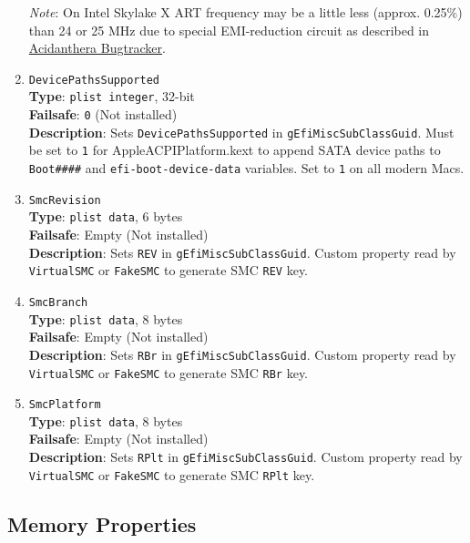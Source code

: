\documentclass[]{article}
\begin{document}
\begin{enumerate}
  \emph{Note}: On Intel Skylake X ART frequency may be a little less (approx. 0.25\%) than
  24 or 25 MHz due to special EMI-reduction circuit as described in
  \href{https://github.com/acidanthera/bugtracker/issues/448#issuecomment-524914166}{Acidanthera Bugtracker}.
\item
  \texttt{DevicePathsSupported}\\
  \textbf{Type}: \texttt{plist\ integer}, 32-bit\\
  \textbf{Failsafe}: \texttt{0} (Not installed)\\
  \textbf{Description}: Sets \texttt{DevicePathsSupported} in
  \texttt{gEfiMiscSubClassGuid}. Must be set to \texttt{1} for
  AppleACPIPlatform.kext to append SATA device paths to
  \texttt{Boot\#\#\#\#} and \texttt{efi-boot-device-data} variables.
  Set to \texttt{1} on all modern Macs.
\item
  \texttt{SmcRevision}\\
  \textbf{Type}: \texttt{plist\ data}, 6 bytes\\
  \textbf{Failsafe}: Empty (Not installed)\\
  \textbf{Description}: Sets \texttt{REV} in
  \texttt{gEfiMiscSubClassGuid}. Custom property read by
  \texttt{VirtualSMC} or \texttt{FakeSMC} to generate SMC \texttt{REV}
  key.
\item
  \texttt{SmcBranch}\\
  \textbf{Type}: \texttt{plist\ data}, 8 bytes\\
  \textbf{Failsafe}: Empty (Not installed)\\
  \textbf{Description}: Sets \texttt{RBr} in
  \texttt{gEfiMiscSubClassGuid}. Custom property read by
  \texttt{VirtualSMC} or \texttt{FakeSMC} to generate SMC \texttt{RBr}
  key.
\item
  \texttt{SmcPlatform}\\
  \textbf{Type}: \texttt{plist\ data}, 8 bytes\\
  \textbf{Failsafe}: Empty (Not installed)\\
  \textbf{Description}: Sets \texttt{RPlt} in
  \texttt{gEfiMiscSubClassGuid}. Custom property read by
  \texttt{VirtualSMC} or \texttt{FakeSMC} to generate SMC \texttt{RPlt}
  key.
\end{enumerate}

\subsection{Memory Properties}\label{platforminfomemory}
\end{document}
